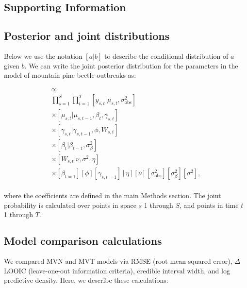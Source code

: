 \documentclass[12pt,english]{article}
\begin{document}
\begin{spacing}{1.2}

\clearpage

\section{Supporting Information}

\subsection{Posterior and joint distributions}

Below we use the notation $[a|b]$ to describe the conditional distribution of
$a$ given $b$. We can write the joint posterior distribution for the parameters
in the model of mountain pine beetle outbreaks as:

\begin{multline}
  [\bm{\mu},
  \bm{\gamma},
  \bm{W},
  \bm{\beta},
  \phi,
  \eta,
  \nu,
  \sigma^2_{\mathrm{obs}},
  \sigma^2_{\beta},
  \sigma^2
  |
  \bm{y}]
  \propto \\
  \prod_{s=1}^{S} \prod_{t=1}^{T}
  [y_{s,t} | \mu_{s,t}, \sigma^2_{\mathrm{obs}}] \\
  \times [\mu_{s,t} | \mu_{s,t-1}, \beta_t, \gamma_{s,t} ] \\
  \times [\gamma_{s,t} | \gamma_{s,t-1}, \phi, W_{s,t}] \\
  \times [\beta_t | \beta_{t-1}, \sigma^2_{\beta}] \\
  \times [W_{s,t} | \nu, \sigma^2, \eta] \\
  \times
  [\beta_{t=1}]
  [\phi]
  [\gamma_{s,t=1}]
  [\eta]
  [\nu]
  [\sigma^2_{\mathrm{obs}}]
  [\sigma^2_{\beta}]
  [\sigma^2],
  \\
\end{multline}

\noindent where the coefficients are defined in the main Methods section. The
joint probability is calculated over points in space $s$ 1 through $S$, and
points in time $t$ 1 through $T$.

\subsection{Model comparison calculations}

We compared MVN and MVT models via RMSE (root mean squared error), $\Delta$
LOOIC (leave-one-out information criteria), credible interval width,
and log predictive density. Here, we describe these calculations:


\end{spacing}
\end{document}
